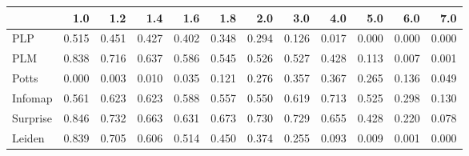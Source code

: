 \begin{tabular}{lrrrrrrrrrrr}
\toprule
{} &   1.0 &   1.2 &   1.4 &   1.6 &   1.8 &   2.0 &   3.0 &   4.0 &   5.0 &   6.0 &   7.0 \\
\midrule
PLP      & 0.515 & 0.451 & 0.427 & 0.402 & 0.348 & 0.294 & 0.126 & 0.017 & 0.000 & 0.000 & 0.000 \\
PLM      & 0.838 & 0.716 & 0.637 & 0.586 & 0.545 & 0.526 & 0.527 & 0.428 & 0.113 & 0.007 & 0.001 \\
Potts    & 0.000 & 0.003 & 0.010 & 0.035 & 0.121 & 0.276 & 0.357 & 0.367 & 0.265 & 0.136 & 0.049 \\
Infomap  & 0.561 & 0.623 & 0.623 & 0.588 & 0.557 & 0.550 & 0.619 & 0.713 & 0.525 & 0.298 & 0.130 \\
Surprise & 0.846 & 0.732 & 0.663 & 0.631 & 0.673 & 0.730 & 0.729 & 0.655 & 0.428 & 0.220 & 0.078 \\
Leiden   & 0.839 & 0.705 & 0.606 & 0.514 & 0.450 & 0.374 & 0.255 & 0.093 & 0.009 & 0.001 & 0.000 \\
\bottomrule
\end{tabular}
